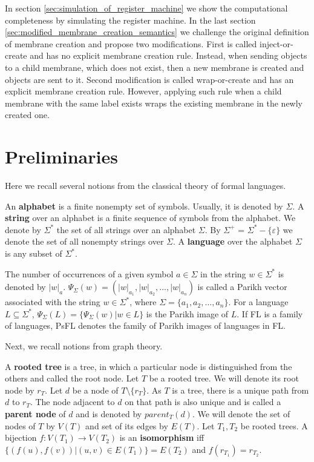 \documentclass[llncs,submission,copyright,creativecommons]{../lib/lncs/llncs}
\def\eps{\varepsilon}
\begin{document}
In section \ref{sec:simulation_of_register_machine} we show the computational completeness by simulating the register machine. In the last section \ref{sec:modified_membrane_creation_semantics} we challenge the original definition of membrane creation and propose two modifications. First is called inject-or-create and has no explicit membrane creation rule. Instead, when sending objects to a child membrane, which does not exist, then a new membrane is created and objects are sent to it. Second modification is called wrap-or-create and has an explicit membrane creation rule. However, applying such rule when a child membrane with the same label exists wraps the existing membrane in the newly created one.

\section{Preliminaries}
\label{sec:preliminaries}

Here we recall several notions from the classical theory of formal languages.

An {\bf alphabet} is a finite nonempty set of symbols. Usually, it is denoted by $\Sigma$. A {\bf string} over an alphabet is a finite sequence of symbols from the alphabet. We denote by $\Sigma^*$ the set of all strings over an alphabet $\Sigma$. By $\Sigma^+$ = $\Sigma^* - \{\eps\}$ we denote the set of all nonempty strings over $\Sigma$. A {\bf language} over the alphabet $\Sigma$ is any subset of $\Sigma^*$.

The number of occurrences of a given symbol $a\in \Sigma$ in the string $w\in \Sigma^*$ is denoted by $|w|_a$. $\Psi_\Sigma(w)=(|w|_{a_1},|w|_{a_2},\dots,|w|_{a_n})$ is called a Parikh vector associated with the string $w\in \Sigma^*$, where $\Sigma=\{a_1,a_2,\dots, a_n\}$. For a language $L\subseteq \Sigma^*$, $\Psi_\Sigma(L)=\{\Psi_\Sigma(w)|w\in L\}$ is the Parikh image of $L$. If FL is a family of languages, PsFL denotes the family of Parikh images of languages in FL.

Next, we recall notions from graph theory.

A {\bf rooted tree} is a tree, in which a particular node is distinguished from the others and called the root node.
Let $T$ be a rooted tree. We will denote its root node by $r_T$.
Let $d$ be a node of $T\setminus\{r_T\}$.
As $T$ is a tree, there is a unique path from $d$ to $r_T$. 
The node adjacent to $d$ on that path is also unique and is called a {\bf parent node} of $d$ and is denoted by $parent_T(d)$.
We will denote the set of nodes of $T$ by $V(T)$ and set of its edges by $E(T)$.
Let $T_1, T_2$ be rooted trees. A bijection $f: V(T_1)\rightarrow V(T_2)$ is an {\bf isomorphism} iff $\{(f(u),f(v))|(u,v)\in E(T_1)\} = E(T_2)$ and $f(r_{T_1}) = r_{T_2}$. 
\end{document}
